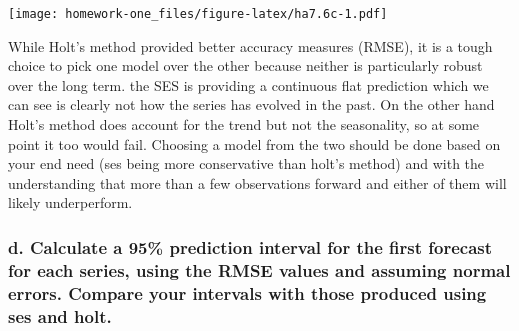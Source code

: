 \documentclass[openany]{book}
\begin{document}
\texttt{[image: homework-one\_files/figure-latex/ha7.6c-1.pdf]}

While Holt's method provided better accuracy measures (RMSE), it is a tough choice to pick one model over the other because neither is particularly robust over the long term. the SES is providing a continuous flat prediction which we can see is clearly not how the series has evolved in the past. On the other hand Holt's method does account for the trend but not the seasonality, so at some point it too would fail. Choosing a model from the two should be done based on your end need (ses being more conservative than holt's method) and with the understanding that more than a few observations forward and either of them will likely underperform.

\hypertarget{d.-calculate-a-95-prediction-interval-for-the-first-forecast-for-each-series-using-the-rmse-values-and-assuming-normal-errors.-compare-your-intervals-with-those-produced-using-ses-and-holt.}{%
\subsubsection{d. Calculate a 95\% prediction interval for the first forecast for each series, using the RMSE values and assuming normal errors. Compare your intervals with those produced using ses and holt.}\label{d.-calculate-a-95-prediction-interval-for-the-first-forecast-for-each-series-using-the-rmse-values-and-assuming-normal-errors.-compare-your-intervals-with-those-produced-using-ses-and-holt.}}
\end{document}
